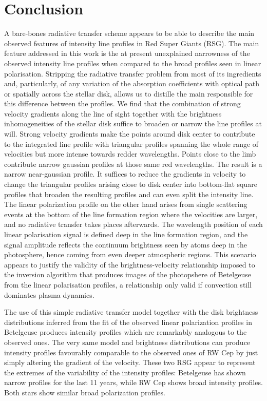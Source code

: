 \documentclass{/Users/art2/TeX/aanda/aa}
\begin{document}
\section{Conclusion}

A bare-bones radiative transfer scheme appears to be able to describe the main observed features of intensity line profiles in Red Super Giants (RSG). 
The main feature addressed in this work is the at present unexplained narrowness of the observed intensity line profiles when compared to the 
broad profiles seen in linear polarisation.  
Stripping the radiative transfer problem from most of its ingredients and, particularly, of any variation of the absorption coefficients 
with optical path or spatially across the stellar disk, allows us to distille the main responsible for this difference between the profiles. We find 
that the combination of strong velocity gradients along the line of sight together with the brightness inhomogeneities of the stellar disk suffice 
to broaden or narrow the line profiles at will. Strong velocity gradients make the points around disk center to contribute to the integrated 
line profile with triangular profiles spanning the whole range of velocities but more intense towards redder wavelengths. Points close to the limb contribute 
narrow gaussian profiles at those same red wavelengths. The result is a narrow near-gaussian profile. It suffices to reduce the gradients in velocity 
to change the triangular profiles arising close to disk center into bottom-flat square profiles that broaden the resulting profiles and can even 
split the intensity line. The linear polarization profile on the other hand arises from single scattering events at the bottom of the line formation 
region where the velocities are larger, and no radiative transfer takes places afterwards. The wavelength position of each linear polarisation signal 
is defined deep in the line formation region, and the signal amplitude reflects the continuum brightness seen by atoms deep in the photosphere, hence 
coming from even deeper atmospheric regions. This scenario appears to justify the validity of the brightness-velocity relationship imposed to the 
inversion algorithm that produces images of the photopshere of Betelgeuse from the linear polarisation profiles, a relationship only valid if convection 
still dominates plasma dynamics.

The use of this simple radiative transfer model together with the disk brightness distributions inferred from the fit of the observed 
linear polarization profiles in Betelgeuse produces intensity profiles which are remarkably analogous to the observed ones. The very same model and 
brightness distributions can produce intensity profiles favourably comparable to the observed ones of RW Cep by just simply altering the gradient 
of the velocity. These two RSG appear to represent the extremes of the variability of the intensity profiles: Betelgeuse has shown narrow profiles 
for the last 11 years, while RW Cep shows broad intensity profiles. Both stars show similar broad polarization profiles.
\end{document}

